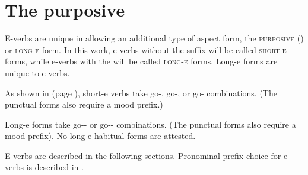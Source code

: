 \section{The purposive} \label{ch:The purposive}
E-verbs are unique in allowing an additional type of aspect form, the \stem{-:} \textsc{purposive} ({\purposive}) or \textsc{long-e} form. In this work, e-verbs without the \stem{-:} {\purposive} suffix will be called \textsc{short-e} forms, while e-verbs with the \stem{-:} {\purposive} will be called \textsc{long-e} forms. Long-e forms are unique to e-verbs.

As shown in  (page \pageref{figtab:1:purposiveasp}), short-e verbs take  go-{\habitual},  go-{\punctual}, or   go-{\stative} combinations. (The punctual forms also require a mood prefix.)

Long-e forms take  go-{\purposive}-{\punctual} or  go-{\purposive}-{\stative} combinations. (The punctual forms also require a mood prefix). No long-e habitual forms are attested.


E-verbs are described in the following sections. Pronominal prefix choice for e-verbs is described in .


